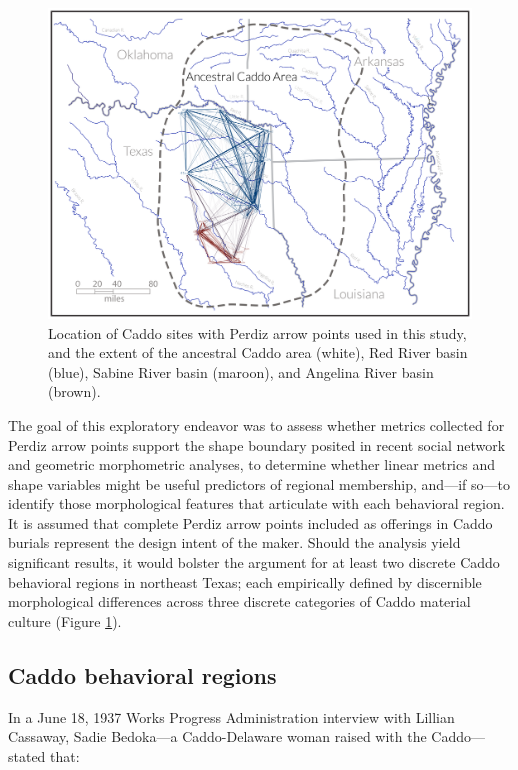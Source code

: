 \documentclass[smallextended]{svjour3}       %
\begin{document}
\begin{figure}
\includegraphics[width=1\linewidth]{ms-figs/figure1} \caption{Location of Caddo sites with Perdiz arrow points used in this study, and the extent of the ancestral Caddo area (white), Red River basin (blue), Sabine River basin (maroon), and Angelina River basin (brown).}\label{fig:fig1}
\end{figure}

The goal of this exploratory endeavor was to assess whether metrics
collected for Perdiz arrow points support the shape boundary posited in
recent social network and geometric morphometric analyses, to determine
whether linear metrics and shape variables might be useful predictors of
regional membership, and---if so---to identify those morphological
features that articulate with each behavioral region. It is assumed that
complete Perdiz arrow points included as offerings in Caddo burials
represent the design intent of the maker. Should the analysis yield
significant results, it would bolster the argument for at least two
discrete Caddo behavioral regions in northeast Texas; each empirically
defined by discernible morphological differences across three discrete
categories of Caddo material culture (Figure \ref{fig:fig1}).

\hypertarget{caddo-behavioral-regions}{%
\subsection{Caddo behavioral regions}\label{caddo-behavioral-regions}}

In a June 18, 1937 Works Progress Administration interview with Lillian
Cassaway, Sadie Bedoka---a Caddo-Delaware woman raised with the
Caddo---stated that:
\end{document}
